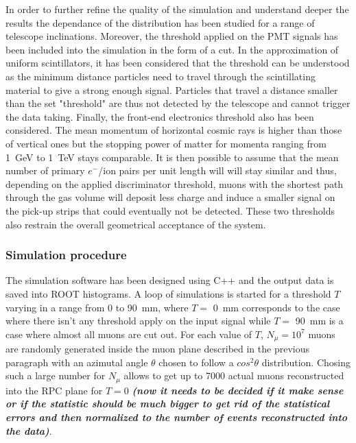 			In order to further refine the quality of the simulation and understand deeper the results the dependance of the distribution has been studied for a range of telescope inclinations. Moreover, the threshold applied on the PMT signals has been included into the simulation in the form of a cut. In the approximation of uniform scintillators, it has been considered that the threshold can be understood as the minimum distance particles need to travel through the scintillating material to give a strong enough signal. Particles that travel a distance smaller than the set "threshold" are thus not detected by the telescope and cannot trigger the data taking. Finally, the front-end electronics threshold also has been considered. The mean momentum of horizontal cosmic rays is higher than those of vertical ones but the stopping power of matter for momenta ranging from \SI{1}{GeV} to \SI{1}{TeV} stays comparable. It is then possible to assume that the mean number of primary $e^-$/ion pairs per unit length will will stay similar and thus, depending on the applied discriminator threshold, muons with the shortest path through the gas volume will deposit less charge and induce a smaller signal on the pick-up strips that could eventually not be detected. These two thresholds also restrain the overall geometrical acceptance of the system.
			
		\subsubsection{Simulation procedure}
		\label{sssec:SimProc}
		
			The simulation software has been designed using C++ and the output data is saved into ROOT histograms. A loop of simulations is started for a threshold $T$ varying in a range from \SI{0}{} to \SI{90}{mm}, where $T=$ \SI{0}{mm} corresponds to the case where there isn't any threshold apply on the input signal while $T=$ \SI{90}{mm} is a case where almost all muons are cut out. For each value of $T$, $N_{\mu}=10^7$ muons are randomly generated inside the muon plane described in the previous paragraph with an azimutal angle $\theta$ chosen to follow a $cos^2\theta$ distribution. Chosing such a large number for $N_{\mu}$ allows to get up to 7000 actual muons reconstructed into the RPC plane for $T=0$ \textit{\textbf{(now it needs to be decided if it make sense or if the statistic should be much bigger to get rid of the statistical errors and then normalized to the number of events reconstructed into the data)}}.
			
